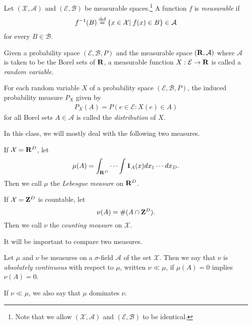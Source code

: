 \documentclass[twoside]{article}
\begin{document}
\begin{definition}\label{def:measurable_function}\citep[Def. 1.7, p.~4]{keener}
Let $(\mathcal X, \mathcal A)$ and $(\mathcal E, \mathcal B)$ be measurable
spaces.\footnote{Note that we allow $(\mathcal X, \mathcal A)$ and
$(\mathcal E, \mathcal B)$ to be identical.}  A function $f$ is
\emph{measurable} if
\begin{align*}
f^{-1}(B) \buildrel \text{d{}ef}\over = \{ x\in \mathcal X |\; f(x) \in B \} \in \mathcal A
\end{align*}
for every $B \in  \mathcal B$.
\end{definition}

\begin{definition}\label{def:random_variable}
Given a probability space $(\mathcal E, \mathcal B, P)$ and the measurable
space $(\mathbf{R}, \mathcal A)$ where $\mathcal A$ is taken to be the Borel
sets of $\mathbf{R}$, a measurable function $X : \mathcal E  \rightarrow \mathbf{R}$
is called a \emph{random variable}.
\end{definition}

For each random variable $X$ of a probability space $(\mathcal E, \mathcal B, P)$,
the induced probability measure $P_X$ given by
\begin{align*}
P_X(A) = P({e \in \mathcal E: X(e) \in A}) 
\end{align*}
for all Borel sets $A \in  \mathcal A$ is called the \emph{distribution} of $X$.


In this class, we will mostly deal with the following two measures.
\begin{example} 
 If $\mathcal X = \mathbf{R}^D$, let
    \[ \mu(A) = \int_{\mathbf{R}^D} \cdots \int \mathbf{1}_A(x) dx_1 \cdots dx_D. \]
  Then we call $\mu$ the \emph{Lebesgue measure} on $\mathbf{R}^D$.
\end{example}
\begin{example} 
  If $\mathcal X = \mathbf{Z}^D$ is countable, let
    \[ \nu(A) = \#(A \cap \mathbf{Z}^D). \]
  Then we call $\nu$ the \emph{counting measure} on $\mathcal X$.
\end{example}

It will be important to compare two measures.

\begin{definition}\label{def:absolutecontinuity}\citep[Def. 1.9, p.~7]{keener}
  Let $\mu$ and $\nu$ be measures on a $\sigma$-field $\mathcal A$ of the
  set $\mathcal X$. Then we say that $\nu$ is \emph{absolutely continuous} with
  respect to $\mu$, written $\nu \ll \mu$, if
  $\mu(A) = 0$ implies $\nu(A) = 0$.
\end{definition}
If $\nu \ll \mu$, we also say that $\mu$ dominates $\nu$.
\end{document}
